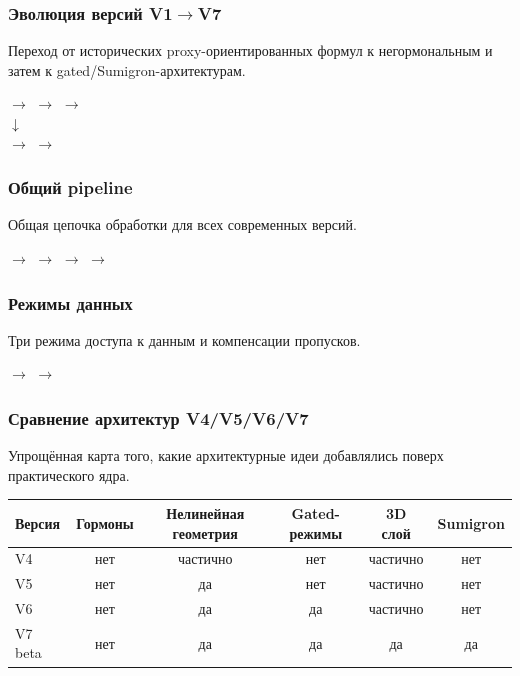 \documentclass[11pt,a4paper]{article}
\begin{document}
\subsubsection*{Эволюция версий V1\ensuremath{\rightarrow}V7} Переход от исторических proxy-ориентированных формул к негормональным и затем к gated/Sumigron-архитектурам.
\begin{center} $\rightarrow$  $\rightarrow$  $\rightarrow$ \\[0.6em]
$\downarrow$\\[0.6em]
 $\rightarrow$  $\rightarrow$ \end{center}
\subsubsection*{Общий pipeline} Общая цепочка обработки для всех современных версий.
\begin{center} $\rightarrow$  $\rightarrow$  $\rightarrow$  $\rightarrow$ \end{center}
\subsubsection*{Режимы данных} Три режима доступа к данным и компенсации пропусков.
\begin{center} $\rightarrow$  $\rightarrow$ \end{center}
\subsubsection*{Сравнение архитектур V4/V5/V6/V7} Упрощённая карта того, какие архитектурные идеи добавлялись поверх практического ядра.
\begin{center}\begin{tabular}{lccccc}\toprule Версия & Гормоны & Нелинейная геометрия & Gated-режимы & 3D слой & Sumigron \\\midrule V4 & нет & частично & нет & частично & нет \\ V5 & нет & да & нет & частично & нет \\ V6 & нет & да & да & частично & нет \\ V7 beta & нет & да & да & да & да \\\bottomrule\end{tabular}\end{center}
\end{document}
